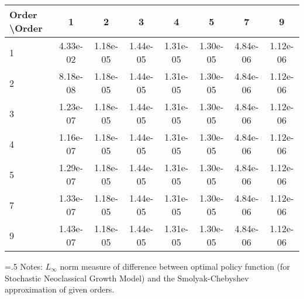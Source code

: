 \begin{tabular*}{1.00\textwidth}{@{\extracolsep{\fill}}l|ccccccc} 
 \hline \hline 
 Order \textbackslash Order & 1 & 2 & 3 & 4 & 5 & 7 & 9 \\ 
 \hline 
1 & 4.33e-02 & 1.18e-05 & 1.44e-05 & 1.31e-05 & 1.30e-05 & 4.84e-06 & 1.12e-06 \\ 
 2 & 8.18e-08 & 1.18e-05 & 1.44e-05 & 1.31e-05 & 1.30e-05 & 4.84e-06 & 1.12e-06 \\ 
 3 & 1.23e-07 & 1.18e-05 & 1.44e-05 & 1.31e-05 & 1.30e-05 & 4.84e-06 & 1.12e-06 \\ 
 4 & 1.16e-07 & 1.18e-05 & 1.44e-05 & 1.31e-05 & 1.30e-05 & 4.84e-06 & 1.12e-06 \\ 
 5 & 1.29e-07 & 1.18e-05 & 1.44e-05 & 1.31e-05 & 1.30e-05 & 4.84e-06 & 1.12e-06 \\ 
 7 & 1.33e-07 & 1.18e-05 & 1.44e-05 & 1.31e-05 & 1.30e-05 & 4.84e-06 & 1.12e-06 \\ 
 9 & 1.43e-07 & 1.18e-05 & 1.44e-05 & 1.31e-05 & 1.30e-05 & 4.84e-06 & 1.12e-06 \\ 
 \hline 
 \end{tabular*} 
\begin{minipage}[t]{1.00\textwidth}{\baselineskip=.5\baselineskip \vspace{.3cm} \footnotesize{ 
Notes: $L_{\infty}$ norm measure of difference between optimal policy function (for Stochastic Neoclassical Growth Model) and the Smolyak-Chebyshev approximation of given orders. \\ 
}} \end{minipage}
